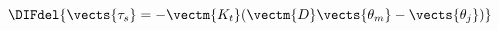 \DIFdelbegin \begin{displaymath}\DIFdel{
	\label{dynamic_model_modifiedKugi_3}
	\vects{\tau_s} = - \vectm{K_t} (\vectm{D} \vects{\theta_m} - \vects{\theta_j})
}\end{displaymath}
\DIFdelend %
%
%

\DIFaddbegin 


